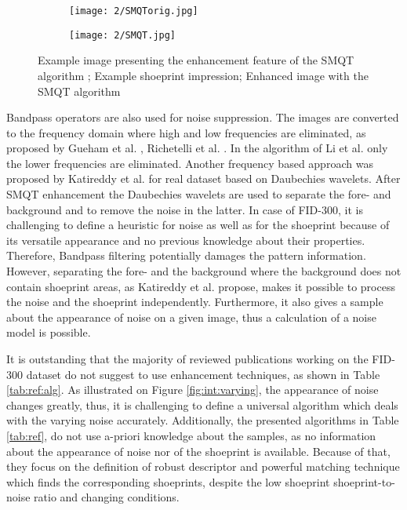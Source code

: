 \documentclass[draft,final]{vutinfth} %
\begin{document}
\begin{figure}[h]
  \centering
  \begin{subfigure}[t]{0.4\columnwidth}
    \centering
    \texttt{[image: 2/SMQTorig.jpg]}
    \subcaption{}
    \label{fig:rw:SMQTin}
  \end{subfigure}
  \begin{subfigure}[t]{0.4\columnwidth}
    \centering
    \texttt{[image: 2/SMQT.jpg]}
    \subcaption{}
    \label{fig:rw:SMQTout}
  \end{subfigure}
  \caption{Example image presenting the enhancement feature of the SMQT algorithm \cite{katireddy2017novel};
		 Example shoeprint impression;  Enhanced image with the SMQT algorithm}
  \label{fig:rw:SMQT} %
\end{figure}

\par
Bandpass operators are also used for noise suppression.
The images are converted to the frequency domain where high and low frequencies are eliminated, as proposed by Gueham et al. \cite{gueham2007automatic},  Richetelli et al. \cite{richetelli2017classification}.
In the algorithm of Li et al. \cite{li2014retrieval} only the lower frequencies are eliminated.
Another frequency based approach was proposed by Katireddy et al. \cite{katireddy2017novel} for real dataset based on Daubechies wavelets.
After SMQT enhancement the Daubechies wavelets are used to separate the fore- and background and to remove the noise in the latter.
In case of FID-300, it is challenging to define a heuristic for noise as well as for the shoeprint because of its versatile appearance and no previous knowledge about their properties.
Therefore, Bandpass filtering potentially damages the pattern information.
However, separating the fore- and the background where the background does not contain shoeprint areas, as Katireddy et al. \cite{katireddy2017novel} propose, makes it possible to process the noise and the shoeprint independently.
Furthermore, it also gives a sample about the appearance of noise on a given image, thus a calculation of a noise model is possible.

\par
It is outstanding that the majority of reviewed publications working on the FID-300 dataset do not suggest to use enhancement techniques, as shown in Table \ref{tab:ref:alg}.
As illustrated on Figure \ref{fig:int:varying}, the appearance of noise changes greatly, thus, it is challenging to define a universal algorithm which deals with the  varying noise accurately.
Additionally, the presented algorithms in Table \ref{tab:ref}, do not use a-priori knowledge about the samples, as no information about the appearance of noise nor of the shoeprint is available.
Because of that, they focus on the definition of robust descriptor and powerful matching technique which finds the corresponding shoeprints, despite the low shoeprint shoeprint-to-noise ratio and changing conditions.
\end{document}
